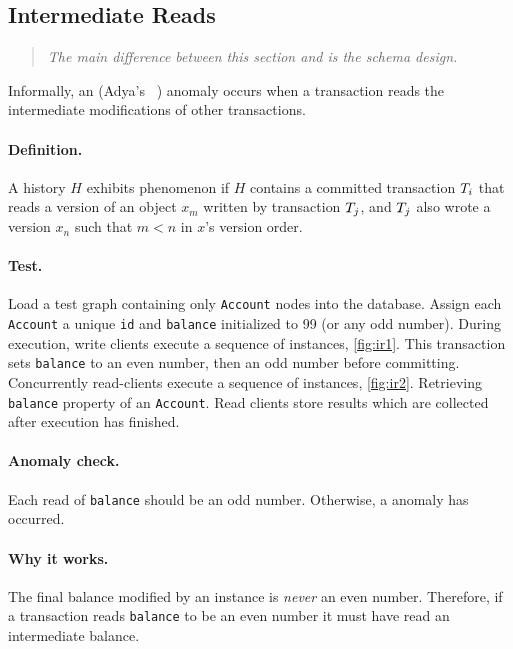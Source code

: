 \subsection*{Intermediate Reads}

\begin{quote}
  \textit{The main difference between this section and \ldbcsnb\xspace
          is the schema design.
  }
\end{quote}

Informally, an  (Adya's ~\cite{adya1999weak}) 
anomaly occurs when a transaction reads the intermediate modifications of other 
transactions.

\paragraph{Definition.}
A history $H$ exhibits phenomenon  if $H$ contains a committed 
transaction $T_i$ that reads a version of an object $x_m$ written by 
transaction $T_j$, and $T_j$ also wrote a version $x_n$ such that 
$m < n$ in $x$'s version order.

\paragraph{Test.}
Load a test graph containing only \texttt{Account} nodes into the database. 
Assign each \texttt{Account} a unique \texttt{id} and \texttt{balance} 
initialized to 99 (or any odd number). During execution, write clients execute a
sequence of  instances, \autoref{fig:ir1}. This 
transaction sets \texttt{balance} to an even number, then an odd number before 
committing. Concurrently read-clients execute a sequence of 
 instances, \autoref{fig:ir2}. Retrieving 
\texttt{balance} property of an \texttt{Account}. Read clients store results 
which are collected after execution has finished.

\paragraph{Anomaly check.}
Each read of \texttt{balance} should be an odd number.
Otherwise, a  anomaly has occurred.

\paragraph{Why it works.}
The final balance modified by an  instance is 
\emph{never} an even number. Therefore, if a transaction reads \texttt{balance} 
to be an even number it must have read an intermediate balance.

